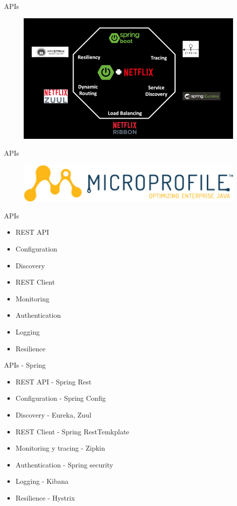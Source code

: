 \documentclass[aspectratio=169]{beamer}
\begin{document}
\begin{frame}{APIs}
    \begin{figure}
        \centering
        \includegraphics[width=0.7\linewidth]{Images/netflix.png}
        \label{fig:container}
    \end{figure}
\end{frame}

\begin{frame}{APIs}
    \begin{figure}
        \centering
        \includegraphics[width=0.7\linewidth]{Images/microprofile.png}
        \label{fig:container}
    \end{figure}
\end{frame}


\begin{frame}{APIs}
    \begin{itemize}
        \item REST API
        \item Configuration
        \item Discovery
        \item REST Client
        \item Monitoring
        \item Authentication
        \item Logging
        \item Resilience
    \end{itemize}
\end{frame}

\begin{frame}{APIs - Spring}
    \begin{itemize}
        \item REST API - Spring Rest
        \item Configuration - Spring Config
        \item Discovery - Eureka, Zuul
        \item REST Client - Spring RestTemkplate
        \item Monitoring y tracing - Zipkin
        \item Authentication - Spring security
        \item Logging - Kibana
        \item Resilience - Hystrix
    \end{itemize}
\end{frame}
\end{document}
